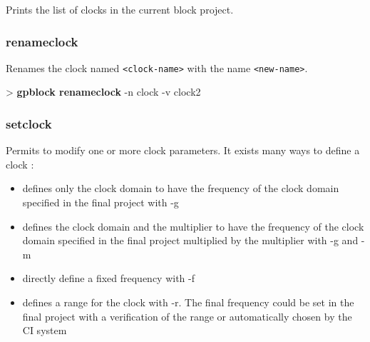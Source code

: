 \documentclass[10pt,a4paper]{article}
\begin{document}
Prints the list of clocks in the current block project.

\subsubsection{renameclock}
\label{subsec:renameclock}

Renames the clock named \texttt{<clock-name>} with the name \texttt{<new-name>}.\\


\begin{sampletitle}
> \textbf{gpblock renameclock} -n clock -v clock2
\end{sampletitle}


\subsubsection{setclock}
\label{subsec:setclock}

Permits to modify one or more clock parameters. It exists many ways to define a clock :
\begin{itemize}
\item defines only the clock domain to have the frequency of the clock domain specified in the final project with -g
\item defines the clock domain and the multiplier to have the frequency of the clock domain specified in the final project multiplied by the multiplier with -g and -m
\item directly define a fixed frequency with -f
\item defines a range for the clock with -r. The final frequency could be set in the final project with a verification of the range or automatically chosen by the CI system
\end{itemize}

\end{document}
